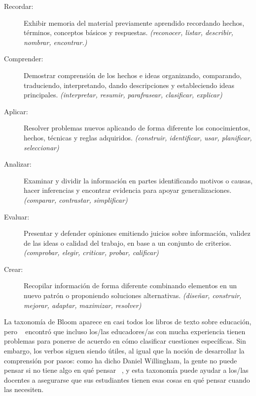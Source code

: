 \begin{description}
 
\item[Recordar:]
  Exhibir memoria del  material previamente aprendido
recordando hechos, términos,
conceptos básicos y respuestas.
  \emph{(reconocer, listar, describir, nombrar, encontrar.)}
 
\item[Comprender:]
  Demostrar comprensión de los hechos e ideas
organizando, comparando, traduciendo, interpretando, dando descripciones y estableciendo ideas principales.
  \emph{(interpretar, resumir, parafrasear, clasificar, explicar)}
 
\item[Aplicar:]
  Resolver problemas nuevos aplicando de forma diferente los conocimientos,
hechos, técnicas y reglas adquiridos.
  \emph{(construir, identificar, usar, planificar, seleccionar)}
 
\item[Analizar:]
  Examinar y dividir la información en partes identificando motivos o causas,
  hacer inferencias y encontrar evidencia para apoyar generalizaciones.
  \emph{(comparar, contrastar, simplificar)}
 
\item[Evaluar:]
  Presentar y defender opiniones emitiendo juicios sobre información,
  validez de las ideas
o calidad del trabajo, en base a un conjunto de criterios.
  \emph{(comprobar, elegir, criticar, probar, calificar)}
 
\item[Crear:]
 Recopilar información de forma diferente
combinando elementos en un nuevo patrón o proponiendo soluciones alternativas.
  \emph{(diseñar, construir, mejorar, adaptar, maximizar, resolver)}
 
\end{description}
 
La taxonomía de Bloom aparece en casi todos los libros de texto sobre educación,
pero ~\cite{Masa2018} encontró que
incluso los/las educadores/as con mucha experiencia tienen problemas para ponerse de acuerdo
en cómo clasificar cuestiones específicas.
Sin embargo, los verbos siguen siendo útiles, al igual que 
la noción de desarrollar la comprensión por pasos:
como ha dicho Daniel Willingham, 
la gente no puede pensar si no tiene algo en qué pensar ~\cite{Will2010},
y esta taxonomía puede ayudar a los/las docentes a asegurarse
que sus estudiantes tienen esas cosas en qué pensar cuando las necesiten.

